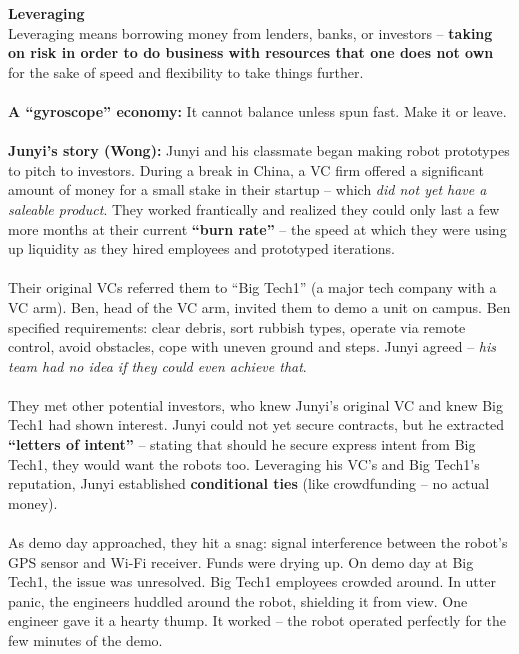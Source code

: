 \documentclass[a4paper,12pt]{article}
\begin{document}
\noindent \textbf{Leveraging} \\
\noindent Leveraging means borrowing money from lenders, banks, or investors -- \textbf{taking on risk in order to do business with resources that one does not own} for the sake of speed and flexibility to take things further. \\
\\
\noindent \textbf{A ``gyroscope'' economy:} It cannot balance unless spun fast. Make it or leave. \\
\\
\noindent \textbf{Junyi's story (Wong):} Junyi and his classmate began making robot prototypes to pitch to investors. During a break in China, a VC firm offered a significant amount of money for a small stake in their startup -- which \emph{did not yet have a saleable product}. They worked frantically and realized they could only last a few more months at their current \textbf{``burn rate''} -- the speed at which they were using up liquidity as they hired employees and prototyped iterations. \\
\\
\noindent Their original VCs referred them to ``Big Tech1'' (a major tech company with a VC arm). Ben, head of the VC arm, invited them to demo a unit on campus. Ben specified requirements: clear debris, sort rubbish types, operate via remote control, avoid obstacles, cope with uneven ground and steps. Junyi agreed -- \emph{his team had no idea if they could even achieve that}. \\
\\
\noindent They met other potential investors, who knew Junyi's original VC and knew Big Tech1 had shown interest. Junyi could not yet secure contracts, but he extracted \textbf{``letters of intent''} -- stating that should he secure express intent from Big Tech1, they would want the robots too. Leveraging his VC's and Big Tech1's reputation, Junyi established \textbf{conditional ties} (like crowdfunding -- no actual money). \\
\\
\noindent As demo day approached, they hit a snag: signal interference between the robot's GPS sensor and Wi-Fi receiver. Funds were drying up. On demo day at Big Tech1, the issue was unresolved. Big Tech1 employees crowded around. In utter panic, the engineers huddled around the robot, shielding it from view. One engineer gave it a hearty thump. It worked -- the robot operated perfectly for the few minutes of the demo. \\
\end{document}

